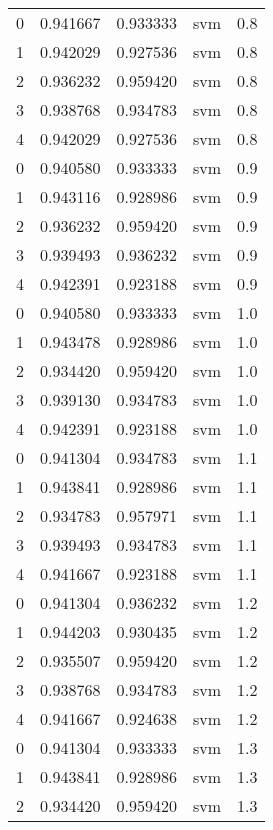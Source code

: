 \begin{tabular}{rrrlr}
     0 & 0.941667 & 0.933333 &      svm &        0.8 \\
     1 & 0.942029 & 0.927536 &      svm &        0.8 \\
     2 & 0.936232 & 0.959420 &      svm &        0.8 \\
     3 & 0.938768 & 0.934783 &      svm &        0.8 \\
     4 & 0.942029 & 0.927536 &      svm &        0.8 \\
     0 & 0.940580 & 0.933333 &      svm &        0.9 \\
     1 & 0.943116 & 0.928986 &      svm &        0.9 \\
     2 & 0.936232 & 0.959420 &      svm &        0.9 \\
     3 & 0.939493 & 0.936232 &      svm &        0.9 \\
     4 & 0.942391 & 0.923188 &      svm &        0.9 \\
     0 & 0.940580 & 0.933333 &      svm &        1.0 \\
     1 & 0.943478 & 0.928986 &      svm &        1.0 \\
     2 & 0.934420 & 0.959420 &      svm &        1.0 \\
     3 & 0.939130 & 0.934783 &      svm &        1.0 \\
     4 & 0.942391 & 0.923188 &      svm &        1.0 \\
     0 & 0.941304 & 0.934783 &      svm &        1.1 \\
     1 & 0.943841 & 0.928986 &      svm &        1.1 \\
     2 & 0.934783 & 0.957971 &      svm &        1.1 \\
     3 & 0.939493 & 0.934783 &      svm &        1.1 \\
     4 & 0.941667 & 0.923188 &      svm &        1.1 \\
     0 & 0.941304 & 0.936232 &      svm &        1.2 \\
     1 & 0.944203 & 0.930435 &      svm &        1.2 \\
     2 & 0.935507 & 0.959420 &      svm &        1.2 \\
     3 & 0.938768 & 0.934783 &      svm &        1.2 \\
     4 & 0.941667 & 0.924638 &      svm &        1.2 \\
     0 & 0.941304 & 0.933333 &      svm &        1.3 \\
     1 & 0.943841 & 0.928986 &      svm &        1.3 \\
     2 & 0.934420 & 0.959420 &      svm &        1.3 \\

\end{tabular}

